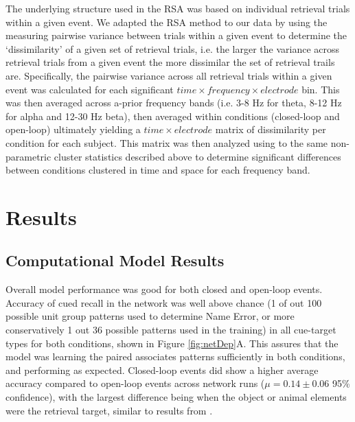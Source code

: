 \documentclass[11pt, titlepage, twoside]{article}
\begin{document}
The underlying structure used in the RSA was based on individual retrieval trials within a given event.  We adapted the RSA method to our data by using the measuring pairwise variance between trials within a given event to determine the `dissimilarity' of a given set of retrieval trials, i.e. the larger the variance across retrieval trials from a given event the more dissimilar the set of retrieval trails are.  Specifically, the pairwise variance across all retrieval trials within a given event was calculated for each significant $time \times frequency \times electrode$ bin.  This was then averaged across a-prior frequency bands (i.e. 3-8 Hz for theta, 8-12 Hz for alpha and 12-30 Hz beta), then averaged within conditions (closed-loop and open-loop) ultimately yielding a $time \times electrode$ matrix of dissimilarity per condition for each subject. This matrix was then analyzed using to the same non-parametric cluster statistics described above to determine significant differences between conditions clustered in time and space for each frequency band.  




\section{Results}\label{sec:results}

\subsection{Computational Model Results}\label{sec:compresults}

Overall model performance was good for both closed and open-loop events.  Accuracy of cued recall in the network was well above chance (1 of out 100 possible unit group patterns used to determine Name Error, or more conservatively 1 out 36 possible patterns used in the training) in all cue-target types for both conditions, shown in Figure \ref{fig:netDep}A.  This assures that the model was learning the paired associates patterns sufficiently in both conditions, and performing as expected. Closed-loop events did show a higher average accuracy compared to open-loop events across network runs ($\mu=0.14\pm0.06$ 95\% confidence), with the largest difference being when the object or animal elements were the retrieval target, similar to results from \textcite{HornerBisbyBushEtAl15}.  
\end{document}
